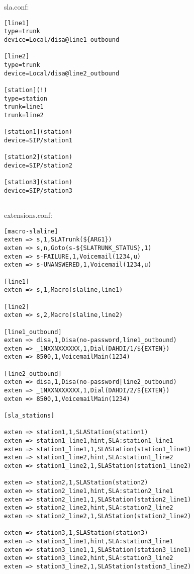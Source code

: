 sla.conf:
\begin{astlisting}
\begin{verbatim}
[line1]
type=trunk
device=Local/disa@line1_outbound

[line2]
type=trunk
device=Local/disa@line2_outbound

[station](!)
type=station
trunk=line1
trunk=line2

[station1](station)
device=SIP/station1

[station2](station)
device=SIP/station2

[station3](station)
device=SIP/station3
	
\end{verbatim}
\end{astlisting}

extensions.conf:
\begin{astlisting}
\begin{verbatim}
[macro-slaline]
exten => s,1,SLATrunk(${ARG1})
exten => s,n,Goto(s-${SLATRUNK_STATUS},1)
exten => s-FAILURE,1,Voicemail(1234,u)
exten => s-UNANSWERED,1,Voicemail(1234,u)

[line1]
exten => s,1,Macro(slaline,line1)

[line2]
exten => s,2,Macro(slaline,line2)

[line1_outbound]
exten => disa,1,Disa(no-password,line1_outbound)
exten => _1NXXNXXXXXX,1,Dial(DAHDI/1/${EXTEN})
exten => 8500,1,VoicemailMain(1234)

[line2_outbound]
exten => disa,1,Disa(no-password|line2_outbound)
exten => _1NXXNXXXXXX,1,Dial(DAHDI/2/${EXTEN})
exten => 8500,1,VoicemailMain(1234)

[sla_stations]

exten => station1,1,SLAStation(station1)
exten => station1_line1,hint,SLA:station1_line1
exten => station1_line1,1,SLAStation(station1_line1)
exten => station1_line2,hint,SLA:station1_line2
exten => station1_line2,1,SLAStation(station1_line2)

exten => station2,1,SLAStation(station2)
exten => station2_line1,hint,SLA:station2_line1
exten => station2_line1,1,SLAStation(station2_line1)
exten => station2_line2,hint,SLA:station2_line2
exten => station2_line2,1,SLAStation(station2_line2)

exten => station3,1,SLAStation(station3)
exten => station3_line1,hint,SLA:station3_line1
exten => station3_line1,1,SLAStation(station3_line1)
exten => station3_line2,hint,SLA:station3_line2
exten => station3_line2,1,SLAStation(station3_line2)
	
\end{verbatim}
\end{astlisting}

